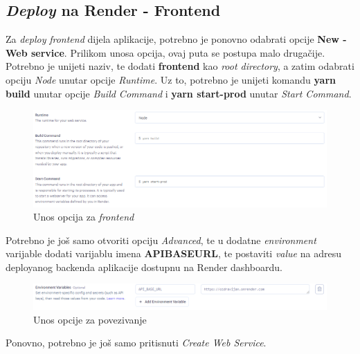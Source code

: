 			\subsection{\textit{Deploy} na Render - Frontend}
			Za \textit{deploy} \textit{frontend} dijela aplikacije, potrebno je ponovno odabrati opcije \textbf{New - Web service}. Prilikom unosa opcija, ovaj puta se postupa malo drugačije. Potrebno je unijeti naziv, te dodati \textbf{frontend} kao \textit{root directory}, a zatim odabrati opciju \textit{Node} unutar opcije \textit{Runtime}. Uz to, potrebno je unijeti komandu \textbf{yarn build} unutar opcije \textit{Build Command} i \textbf{yarn start-prod} unutar \textit{Start Command}. 
			\begin{figure}[H]
				\includegraphics[scale=0.8]{slike/render5.PNG} %
				\centering
				\caption{Unos opcija za \textit{frontend}}
				\label{fig:render5}
			\end{figure}
			Potrebno je još samo otvoriti opciju \textit{Advanced}, te u dodatne \textit{environment} varijable dodati varijablu imena\textbf{ API\textunderscore BASE\textunderscore URL}, te postaviti \textit{value} na adresu deployanog backenda aplikacije dostupnu na Render dashboardu.
			\begin{figure}[H]
				\includegraphics[scale=0.8]{slike/render6.PNG} %
				\centering
				\caption{Unos opcije za povezivanje}
				\label{fig:render6}
			\end{figure}
			Ponovno, potrebno je još samo pritisnuti \textit{Create Web Service}.
			
			
			\eject 